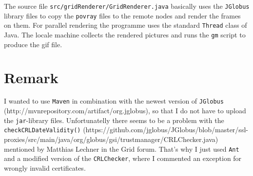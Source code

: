 \documentclass{article}
\begin{document}
The source file \texttt{src/\-grid\-Renderer/\-Grid\-Renderer\-.java} basically uses the \texttt{JGlobus} library files to copy the \texttt{povray} files to the remote nodes and render the frames on them. For parallel rendering the programme uses the standard \texttt{Thread} class of Java. The locale machine collects the rendered pictures and runs the \texttt{gm} script to produce the gif file.

\section{Remark}
I wanted to use \texttt{Maven} in combination with the newest version of \texttt{JGlobus} (http://\-mvnrepository.\-com/\-artifact/\-org.\-jglobus), so that I do not have to upload the \texttt{jar}-library files. Unfortunatelly there seems to be a problem with the \texttt{checkCRLDateValidity()} (https://\-github.\-com/\-jglobus/\-JGlobus/\-blob/\-master/\-ssl-proxies/\-src/\-main/\-java/\-org/\-globus/\-gsi/\-trust\-manager/\-CRL\-Checker.java) mentioned by Matthias Lechner in the Grid forum. That's why I just used \texttt{Ant} and a modified version of the \texttt{CRLChecker}, where I commented an exception for wrongly invalid certificates.





\end{document}
